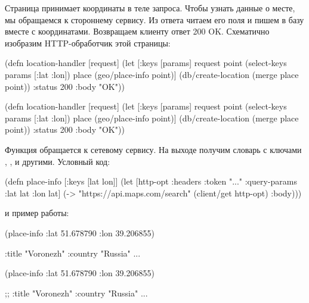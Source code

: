 Страница  принимает координаты в теле запроса. Чтобы узнать
данные о месте, мы обращаемся к стороннему сервису. Из ответа читаем его поля и
пишем в базу вместе с координатами. Возвращаем клиенту ответ 200 OK. Схематично
изобразим HTTP-обработчик этой страницы:

\ifnarrow

\begin{clojure}
(defn location-handler [request]
  (let [{:keys [params]} request
        point (select-keys params
                [:lat :lon])
        place (geo/place-info point)]
    (db/create-location
      (merge place point))
    {:status 200 :body "OK"}))
\end{clojure}

\else

\begin{clojure}
(defn location-handler [request]
  (let [{:keys [params]} request
        point (select-keys params [:lat :lon])
        place (geo/place-info point)]
    (db/create-location (merge place point))
    {:status 200 :body "OK"}))
\end{clojure}

\fi

Функция  обращается к сетевому сервису. На выходе получим
словарь с ключами , ,  и
другими. Условный код:

\begin{clojure}
(defn place-info
  [{:keys [lat lon]}]
  (let [http-opt
        {:headers {:token "..."}
         :query-params {:lat lat
                        :lon lat}}]
    (-> "https://api.maps.com/search"
        (client/get http-opt)
        :body)))
\end{clojure}

\noindent
и пример работы:

\ifnarrow

\begin{clojure}
(place-info {:lat 51.678790
             :lon 39.206855})

{:title "Voronezh"
 :country "Russia"
 ...}
\end{clojure}

\else

\begin{clojure}
(place-info {:lat 51.678790 :lon 39.206855})

;; {:title "Voronezh" :country "Russia" ...}
\end{clojure}

\fi

